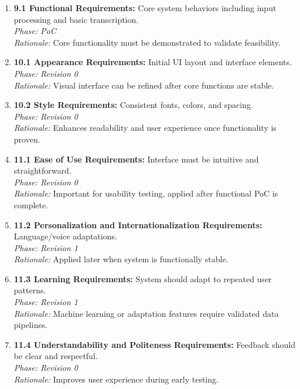 \documentclass[12pt]{article}
\begin{document}
\begin{enumerate}
    \item \textbf{9.1 Functional Requirements:} Core system behaviors including input processing and basic transcription.\\
    \textit{Phase: PoC} \\
    \textit{Rationale:} Core functionality must be demonstrated to validate feasibility.

    \item \textbf{10.1 Appearance Requirements:} Initial UI layout and interface elements.\\
    \textit{Phase: Revision 0} \\
    \textit{Rationale:} Visual interface can be refined after core functions are stable.

    \item \textbf{10.2 Style Requirements:} Consistent fonts, colors, and spacing.\\
    \textit{Phase: Revision 0} \\
    \textit{Rationale:} Enhances readability and user experience once functionality is proven.

    \item \textbf{11.1 Ease of Use Requirements:} Interface must be intuitive and straightforward.\\
    \textit{Phase: Revision 0} \\
    \textit{Rationale:} Important for usability testing, applied after functional PoC is complete.

    \item \textbf{11.2 Personalization and Internationalization Requirements:} Language/voice adaptations.\\
    \textit{Phase: Revision 1} \\
    \textit{Rationale:} Applied later when system is functionally stable.

    \item \textbf{11.3 Learning Requirements:} System should adapt to repeated user patterns.\\
    \textit{Phase: Revision 1} \\
    \textit{Rationale:} Machine learning or adaptation features require validated data pipelines.

    \item \textbf{11.4 Understandability and Politeness Requirements:} Feedback should be clear and respectful.\\
    \textit{Phase: Revision 0} \\
    \textit{Rationale:} Improves user experience during early testing.


\end{enumerate}
\end{document}
